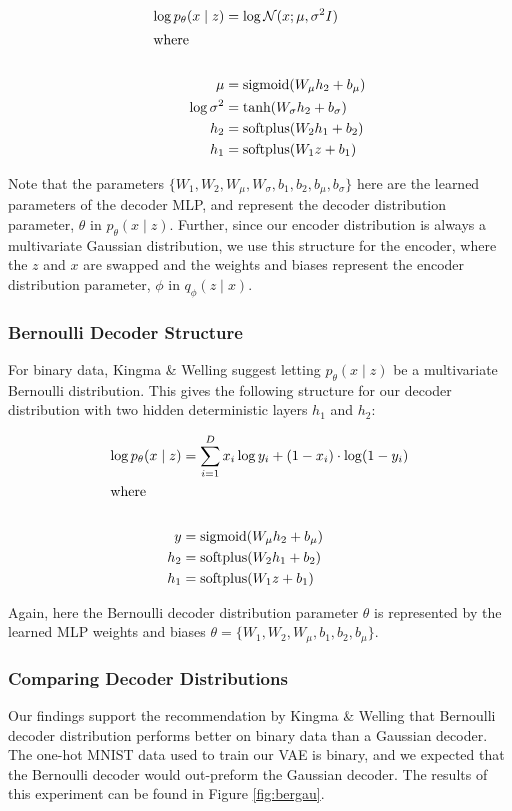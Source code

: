 \documentclass{article} %
\begin{document}
\begin{align*}
    \log p_\theta(x\mid z) &= \log \mathcal{N}(x; \mu, \sigma^2 I)\\
    \intertext{where}\\
    \mu &= \text{sigmoid}(W_\mu h_2 + b_\mu)\\
    \log \sigma^2 &= \text{tanh}(W_\sigma h_2+ b_\sigma)\\
    h_2 &= \text{softplus}(W_{2} h_1 + b_{2})\\
    h_1 &= \text{softplus}(W_{1} z + b_{1})
\end{align*}

Note that the parameters $\{W_1,W_2,W_\mu,W_\sigma,b_1,b_2,b_\mu,b_\sigma\}$ here are the learned parameters of the decoder MLP, and represent the decoder distribution parameter, $\theta$ in $p_\theta(x\mid z)$. Further, since our encoder distribution is always a multivariate Gaussian distribution, we use this structure for the encoder, where the $z$ and $x$ are swapped and the weights and biases represent the encoder distribution parameter, $\phi$ in ${q_\phi(z \mid x)}$.\\

\subsubsection{Bernoulli Decoder Structure}
For binary data, Kingma \& Welling suggest letting ${p_\theta(x\mid z)}$ be a multivariate Bernoulli distribution. This gives the following structure for our decoder distribution with two hidden deterministic layers $h_1$ and $h_2$:

\begin{align*}
    \log p_\theta(x\mid z) &= \sum_{i=1}^D x_i \log y_i + (1-x_i) \cdot \log (1-y_i)\\
    \intertext{where}\\
    y&=\text{sigmoid}(W_\mu h_2 + b_\mu)\\
    h_2&= \text{softplus}(W_2 h_1 +b_2)\\
    h_1 &= \text{softplus}(W_1 z + b_1)\\
\end{align*}

Again, here the Bernoulli decoder distribution parameter $\theta$ is represented by the learned MLP weights and biases $\theta = \{W_1,W_2,W_\mu,b_1,b_2,b_\mu\}$.\\

\subsubsection{Comparing Decoder Distributions}
Our findings support the recommendation by Kingma \& Welling that Bernoulli decoder distribution performs better on binary data than a Gaussian decoder. The one-hot MNIST data used to train our VAE is binary, and we expected that the Bernoulli decoder would out-preform the Gaussian decoder. The results of this experiment can be found in Figure \ref{fig:bergau}.
\end{document}
